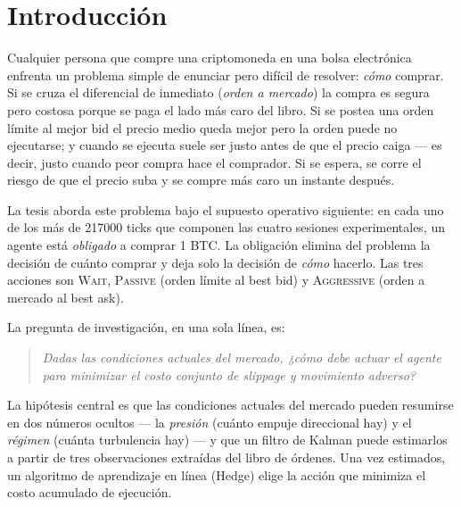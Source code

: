 \documentclass[journal,onecolumn,11pt]{IEEEtran}
\begin{document}
\section{Introducción}\label{sec:intro}

Cualquier persona que compre una criptomoneda en una bolsa electrónica
enfrenta un problema simple de enunciar pero difícil de resolver:
\emph{cómo} comprar. Si se cruza el diferencial de inmediato (\emph{orden
a mercado}) la compra es segura pero costosa porque se paga el lado más
caro del libro. Si se postea una orden límite al mejor bid el precio
medio queda mejor pero la orden puede no ejecutarse; y cuando se ejecuta
suele ser justo antes de que el precio caiga --- es decir, justo cuando
peor compra hace el comprador. Si se espera, se corre el riesgo de que
el precio suba y se compre más caro un instante después.

\medskip

La tesis aborda este problema bajo el supuesto operativo siguiente: en
cada uno de los más de \num{217000} ticks que componen las cuatro
sesiones experimentales, un agente está \emph{obligado} a comprar 1 BTC.
La obligación elimina del problema la decisión de cuánto comprar y deja
solo la decisión de \emph{cómo} hacerlo. Las tres acciones son
\textsc{Wait}, \textsc{Passive} (orden límite al best bid) y
\textsc{Aggressive} (orden a mercado al best ask).

\medskip

La pregunta de investigación, en una sola línea, es:
\begin{quote}
\emph{Dadas las condiciones actuales del mercado, ¿cómo debe actuar el
agente para minimizar el costo conjunto de slippage y movimiento
adverso?}
\end{quote}

\medskip

La hipótesis central es que las condiciones actuales del mercado pueden
resumirse en dos números ocultos --- la \emph{presión} (cuánto empuje
direccional hay) y el \emph{régimen} (cuánta turbulencia hay) --- y que
un filtro de Kalman puede estimarlos a partir de tres observaciones
extraídas del libro de órdenes. Una vez estimados, un algoritmo de
aprendizaje en línea (Hedge) elige la acción que minimiza el costo
acumulado de ejecución.

\medskip
\end{document}
